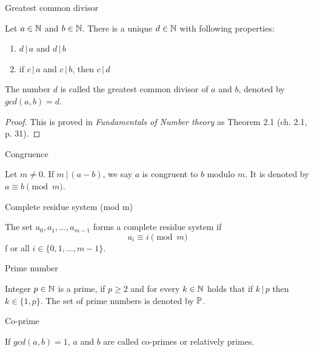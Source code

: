 \documentclass{article}
\begin{document}
\begin{theorem}
Greatest common divisor

Let $a \in \mathbb{N}$ and $b \in \mathbb{N}$. There is a unique $d \in \mathbb{N}$ with following properties:

\begin{enumerate}
 \item $d \,\vert\, a$ and $d \,\vert\, b$
 \item if $c \,\vert\, a$ and $c \,\vert\, b$, then $c \,\vert\, d$
\end{enumerate}

The number $d$ is called the greatest common divisor of $a$ and $b$, denoted by $gcd(a,b) = d$.

\begin{proof}
This is proved in \textit{Fundamentals of Number theory} \cite{LeVeque} as Theorem 2.1 (ch. 2.1, p. 31).
\end{proof}
\end{theorem}

\begin{definition}
Congruence

Let $m\not=0$. If $m\,\vert\,(a-b)$, we say $a$ is congruent to $b$ modulo $m$. It is denoted by $a\equiv b \pmod{m}$.
\end{definition}

\begin{definition}
Complete residue system (mod m)

The set $a_0,a_1,\dots,a_{m-1}$ forms a complete residue system if
\begin{equation*}
    a_i \equiv i \pmod{m}
\end{equation*}f
or all $i\in\{0,1,\dots,m-1\}$.
\end{definition}

\begin{definition}
Prime number

Integer $p\in\mathbb{N}$ is a prime, if $p \geq 2$ and for every $k\in\mathbb{N}$ holds that if $k \,\vert\, p$ then $k\in\{1, p\}$. The set of prime numbers is denoted by $\mathbb{P}$.


\end{definition}

\begin{definition}
Co-prime

If $gcd(a,b) = 1$, $a$ and $b$ are called co-primes or relatively primes.
\end{definition}
\end{document}
